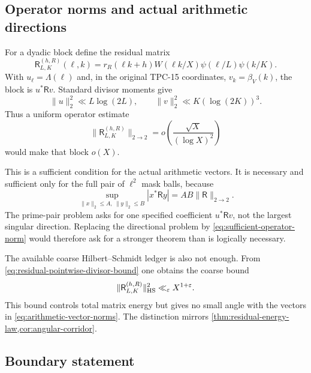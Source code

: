 \subsection{Operator norms and actual arithmetic directions}

For a dyadic block define the residual matrix
\begin{equation}
 \mathsf R_{L,K}^{(h,R)}(\ell,k)=
 r_R(\ell k+h)W(\ell k/X)\psi(\ell/L)\psi(k/K).
 \label{eq:dyadic-residual-matrix}
\end{equation}
With $u_\ell=\Lambda(\ell)$ and, in the original TPC-15 coordinates,
$v_k=\beta_V(k)$, the block is $u^*\mathsf Rv$.  Standard divisor moments
give
\begin{equation}
 \|u\|_2^2\ll L\log(2L),
 \qquad
 \|v\|_2^2\ll K(\log(2K))^3.
 \label{eq:arithmetic-vector-norms}
\end{equation}
Thus a uniform operator estimate
\begin{equation}
 \|\mathsf R_{L,K}^{(h,R)}\|_{2\to2}
 =o\left(\frac{\sqrt X}{(\log X)^2}\right)
 \label{eq:sufficient-operator-norm}
\end{equation}
would make that block $o(X)$.

This is a sufficient condition for the actual arithmetic vectors.  It is
necessary and sufficient only for the full pair of $\ell^2$ mask balls,
because
\begin{equation}
 \sup_{\|x\|_2\le A,\ \|y\|_2\le B}
 |x^*\mathsf Ry|=AB\|\mathsf R\|_{2\to2}.
 \label{eq:operator-duality}
\end{equation}
The prime-pair problem asks for one specified coefficient
$u^*\mathsf Rv$, not the largest singular direction.  Replacing the
directional problem by \eqref{eq:sufficient-operator-norm} would therefore
ask for a stronger theorem than is logically necessary.

The available coarse Hilbert--Schmidt ledger is also not enough.  From
\eqref{eq:residual-pointwise-divisor-bound} one obtains the coarse bound
\begin{equation}
 \|\mathsf R_{L,K}^{(h,R)}\|_{\rm HS}^2
 \ll_\varepsilon X^{1+\varepsilon}.
 \label{eq:Hilbert-Schmidt-ledger}
\end{equation}
This bound controls total matrix energy but gives no small angle with the
vectors in \eqref{eq:arithmetic-vector-norms}.  The distinction mirrors
\cref{thm:residual-energy-law,cor:angular-corridor}.

\subsection{Boundary statement}


